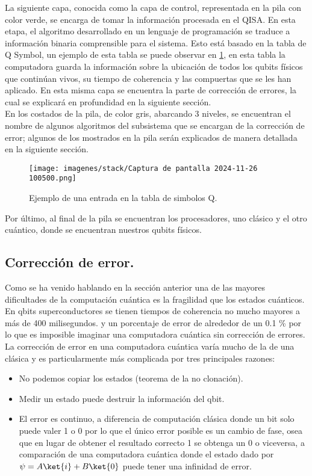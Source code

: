 La siguiente capa, conocida como la capa de control, representada en la pila con color verde, se encarga de tomar la información procesada en el QISA. En esta etapa, el algoritmo desarrollado en un lenguaje de programación se traduce a información binaria comprensible para el sistema. Esto está basado en la tabla de Q Symbol, un ejemplo de esta tabla se puede observar en \ref{fig:Q-symbols}, en esta tabla la computadora guarda la información sobre la ubicación de todos los qubits físicos que continúan vivos, su tiempo de coherencia y las compuertas que se les han aplicado. En esta misma capa se encuentra la parte de corrección de errores, la cual se explicará en profundidad en la siguiente sección.\\

En los costados de la pila, de color gris, abarcando 3 niveles, se encuentran el nombre de algunos algoritmos del subsistema que se encargan de la corrección de error; algunos de los mostrados en la pila serán explicados de manera detallada en la siguiente sección.

\begin{figure}
    \centering
    \texttt{[image: imagenes/stack/Captura de pantalla 2024-11-26 100500.png]}
    \caption{Ejemplo de una entrada en la tabla de simbolos Q.}
    \label{fig:Q-symbols}
\end{figure}

Por último, al final de la pila se encuentran los procesadores, uno clásico y el otro cuántico, donde se encuentran nuestros qubits físicos.\\


\subsection{Corrección de error.}

Como se ha venido hablando en la sección anterior una de las mayores dificultades de la computación cuántica es la fragilidad que los estados cuánticos. En qbits superconductores se tienen tiempos de coherencia no mucho mayores a más de 400 milisegundos. %
y un porcentaje de error de alrededor de un 0.1 \% por lo que es imposible imaginar una computadora cuántica sin corrección de errores.\\

La corrección de error en una computadora cuántica varía mucho de la de una clásica y es particularmente más complicada por tres principales razones:
\begin{itemize}
    \item No podemos copiar los estados  (teorema de la no clonación).
    \item Medir un estado puede destruir la información del qbit.
    \item El error es continuo, a diferencia de computación clásica donde un bit solo puede valer 1 o 0 por lo que el único error posible es un cambio de fase, osea que en lugar de obtener el resultado correcto 1 se obtenga un 0 o viceversa, a comparación de una computadora cuántica donde el estado dado por $\psi=A\ket{i}+B\ket{0}$ puede tener una infinidad de error.
\end{itemize}

